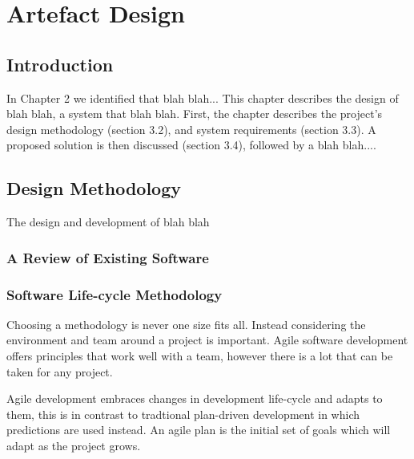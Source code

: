 \chapter{Artefact Design}

\section{Introduction} \label{a-d--introduction}

In Chapter 2 we identified that blah blah...
This chapter describes the design of blah blah, a system that blah blah.  First, the chapter describes the project’s design methodology (section 3.2), and system requirements (section 3.3).  A proposed solution is then discussed (section 3.4), followed by a blah blah....


\section{Design Methodology} \label{a-d--methodology}

The design and development of blah blah

\subsection{A Review of Existing Software} \label{a--d--review-of-existing-software}


\subsection{Software Life-cycle Methodology} \label{a-d--methodology--life-cycle}

Choosing a methodology is never one size fits all. Instead considering the environment and team around a project is important. Agile software development offers principles that work well with a team, however there is a lot that can be taken for any project.

Agile development embraces changes in development life-cycle and adapts to them, this is in contrast to tradtional plan-driven development in which predictions are used instead. An agile plan is the initial set of goals which will adapt as the project grows. \cite{fowler_agile} %

